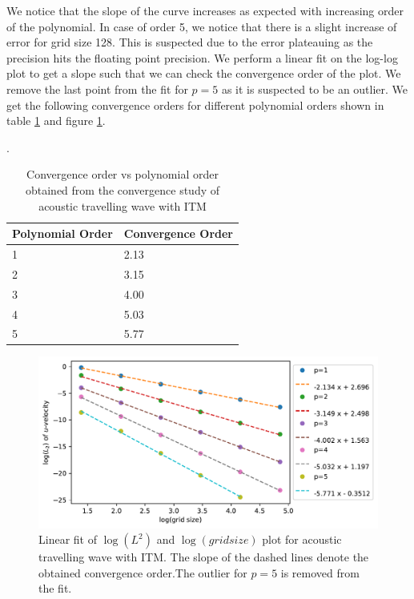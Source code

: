 We notice that the slope of the curve increases as expected with increasing order of the polynomial. In case of order 5, we notice that there is a slight increase
of error for grid size 128. This is suspected due to the error plateauing as the precision hits the floating point precision. We perform a linear fit on the log-log
plot to get a slope such that we can check the convergence order of the plot. We remove the last point from the fit for $p=5$ as it is suspected to be an outlier. 
We get the following convergence orders for different polynomial orders shown in table \ref{table:convergenceorder} and figure \ref{fig:convergenceorder}.

\begin{center}
\begin{table}[]
    \centering
    \caption{Convergence order vs polynomial order obtained from the convergence study of acoustic travelling wave with \ac{ITM}}.
    \label{table:convergenceorder}
    \begin{tabular}{|l|l|}
        \hline
     \textbf{Polynomial Order}& \textbf{Convergence Order}  \\
     \hline
     1 & 2.13\\
     \hline
     2 & 3.15 \\
     \hline
     3 & 4.00 \\
     \hline
     4 & 5.03 \\
        \hline
        5 & 5.77\\
        \hline
    \end{tabular}
    \end{table}
\end{center}

\begin{figure}
    \centering
    \includegraphics[width=\linewidth]{figures/error2.pdf}
    \caption{Linear fit of $\log\left(L^2\right)$ and $\log\left(grid size\right)$  plot for acoustic travelling wave with \ac{ITM}. The slope of the dashed lines denote the 
    obtained convergence order.The outlier for $p=5$ is removed from the fit.}
    \label{fig:convergenceorder}
\end{figure}

